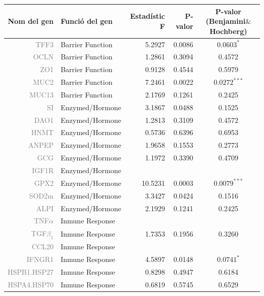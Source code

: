 \documentclass[english]{article}
\begin{document}
\begin{table}[ht]
\centering
\begin{tabular}{rlrrc}
    \toprule
{\textbf{Nom del gen}} & {\textbf{Funció del gen }} & {\textbf{Estadístic F}} & {\textbf{P-valor}} & {\textbf{P-valor (Benjamini$\&$Hochberg)}} \\
  \midrule
{\textcolor{gray}{TFF3}} & Barrier Function & 5.2927 & 0.0086 & $0.0603^{*}$ \\
  {\textcolor{gray}{OCLN}} & Barrier Function & 1.2861 & 0.3094 & 0.4572 \\
  {\textcolor{gray}{ZO1}} & Barrier Function & 0.9128 & 0.4544 & 0.5979 \\
  {\textcolor{gray}{MUC2}} & Barrier Function & 7.2461 & 0.0022 & $0.0272^{***}$ \\
  {\textcolor{gray}{MUC13}} & Barrier Function & 2.1769 & 0.1261 & 0.2425 \\
  {\textcolor{gray}{SI}} & Enzymed/Hormone & 3.1867 & 0.0488 & 0.1525 \\
  {\textcolor{gray}{DAO1}} & Enzymed/Hormone & 1.2813 & 0.3109 & 0.4572 \\
  {\textcolor{gray}{HNMT}} & Enzymed/Hormone & 0.5736 & 0.6396 & 0.6953 \\
  {\textcolor{gray}{ANPEP}} & Enzymed/Hormone & 1.9658 & 0.1553 & 0.2773 \\
  {\textcolor{gray}{GCG}} & Enzymed/Hormone & 1.1972 & 0.3390 & 0.4709 \\
  {\textcolor{gray}{IGF1R}} & Enzymed/Hormone &  &  &  \\
  {\textcolor{gray}{GPX2}} & Enzymed/Hormone & 10.5231 & 0.0003 & $0.0079^{***}$\\
  {\textcolor{gray}{SOD2m}} & Enzymed/Hormone & 3.3427 & 0.0424 & 0.1516 \\
  {\textcolor{gray}{ALPI}} & Enzymed/Hormone & 2.1929 & 0.1241 & 0.2425 \\
  {\textcolor{gray}{TNF$\alpha$}} & Inmune Response &  &  &  \\
  {\textcolor{gray}{TGF$\beta_1$}} & Inmune Response & 1.7353 & 0.1956 & 0.3260 \\
  {\textcolor{gray}{CCL20}} & Inmune Response &  &  &  \\
  {\textcolor{gray}{IFNGR1}} & Inmune Response & 4.5897 & 0.0148 & $0.0741^{*}$ \\
  {\textcolor{gray}{HSPB1.HSP27}} & Inmune Response & 0.8298 & 0.4947 & 0.6184 \\
  {\textcolor{gray}{HSPA4.HSP70}} & Inmune Response & 0.6819 & 0.5745 & 0.6529 \\

\end{tabular}
\end{table}
\end{document}
